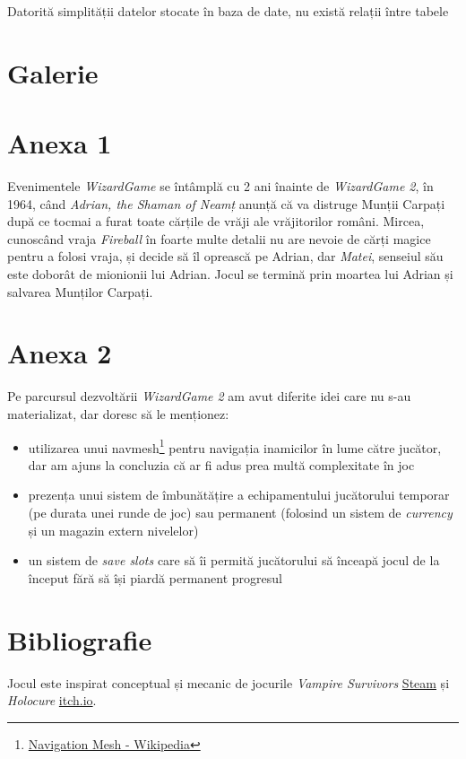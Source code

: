 \documentclass{article}
\begin{document}
    Datorită simplității datelor stocate în baza de date, nu există relații între tabele

    \section{Galerie}

    \section*{Anexa 1}
    \label{sec:anexa1}
    Evenimentele \emph{WizardGame} se întâmplă cu 2 ani înainte de \emph{WizardGame 2}, în 1964,
    când \emph{Adrian, the Shaman of Neamț} anunță că va distruge Munții Carpați după ce tocmai
    a furat toate cărțile de vrăji ale vrăjitorilor români. Mircea, cunoscând vraja \emph{Fireball}
    în foarte multe detalii nu are nevoie de cărți magice pentru a folosi vraja, și decide să îl
    oprească pe Adrian, dar \emph{Matei}, senseiul său este doborât de mionionii lui Adrian.
    Jocul se termină prin moartea lui Adrian și salvarea Munților Carpați.

    \section*{Anexa 2}
    Pe parcursul dezvoltării \emph{WizardGame 2} am avut diferite idei care nu s-au materializat,
    dar doresc să le menționez:
    \begin{itemize}
        \item utilizarea unui navmesh\footnote{\href{https://en.wikipedia.org/wiki/Navigation_mesh}{Navigation Mesh - Wikipedia}}
        pentru navigația inamicilor în lume către jucător, dar am ajuns la concluzia că ar fi adus
        prea multă complexitate în joc
        \item prezența unui sistem de îmbunătățire a echipamentului jucătorului temporar (pe durata
        unei runde de joc) sau permanent (folosind un sistem de \emph{currency} și un magazin extern
        nivelelor)
        \item un sistem de \emph{save slots} care să îi permită jucătorului să înceapă jocul de la
        început fără să își piardă permanent progresul
    \end{itemize}

    \section*{Bibliografie}
    Jocul este inspirat conceptual și mecanic de jocurile \emph{Vampire Survivors}
    \href{https://store.steampowered.com/app/1794680/Vampire_Survivors/}{Steam} și
    \emph{Holocure} \href{https://kay-yu.itch.io/holocure}{itch.io}.
\end{document}
